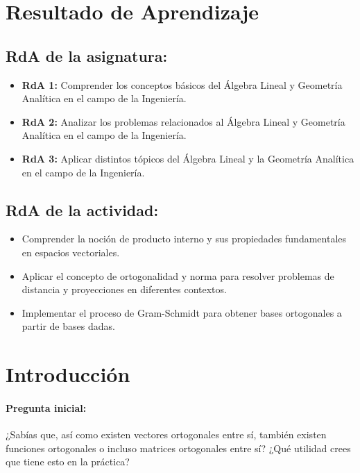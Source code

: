 \documentclass[a4,11pt]{aleph-notas}
\begin{document}
\encabezado

\section*{Resultado de Aprendizaje}

\subsection*{RdA de la asignatura:}
\begin{itemize}[leftmargin=*]
    \item \textbf{RdA 1:} Comprender los conceptos básicos del Álgebra Lineal y Geometría Analítica en el campo de la Ingeniería.
    \item \textbf{RdA 2:} Analizar los problemas relacionados al Álgebra Lineal y Geometría Analítica en el campo de la Ingeniería.
    \item \textbf{RdA 3:} Aplicar distintos tópicos del Álgebra Lineal y la Geometría Analítica en el campo de la Ingeniería.
\end{itemize}

\subsection*{RdA de la actividad:}
\begin{itemize}[leftmargin=*]
    \item Comprender la noción de producto interno y sus propiedades fundamentales en espacios vectoriales.
    \item Aplicar el concepto de ortogonalidad y norma para resolver problemas de distancia y proyecciones en diferentes contextos.
    \item Implementar el proceso de Gram-Schmidt para obtener bases ortogonales a partir de bases dadas.
\end{itemize}

\section*{Introducción}

\paragraph{Pregunta inicial:} 
¿Sabías que, así como existen vectores ortogonales entre sí, también existen funciones ortogonales o incluso matrices ortogonales entre sí? ¿Qué utilidad crees que tiene esto en la práctica?
\end{document}
